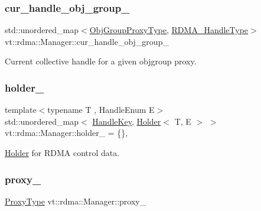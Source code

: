 \subsubsection{\texorpdfstring{cur\+\_\+handle\+\_\+obj\+\_\+group\+\_\+}{cur\_handle\_obj\_group\_}}
{\footnotesize\ttfamily std\+::unordered\+\_\+map$<$\hyperlink{namespacevt_ad7cae989df485fccca57f0792a880a8e}{Obj\+Group\+Proxy\+Type}, \hyperlink{namespacevt_a10442579ec4e7ebef223818e64bcf908}{R\+D\+M\+A\+\_\+\+Handle\+Type}$>$ vt\+::rdma\+::\+Manager\+::cur\+\_\+handle\+\_\+obj\+\_\+group\+\_\+\hspace{0.3cm}{\ttfamily [private]}}



Current collective handle for a given objgroup proxy. 

\mbox{\label{structvt_1_1rdma_1_1_manager_ab5b5ed6b205fba6f378ef22cdb3d4143}} 
\subsubsection{\texorpdfstring{holder\+\_\+}{holder\_}}
{\footnotesize\ttfamily template$<$typename T , Handle\+Enum E$>$ \\
std\+::unordered\+\_\+map$<$ \hyperlink{structvt_1_1rdma_1_1_handle_key}{Handle\+Key}, \hyperlink{structvt_1_1rdma_1_1_holder}{Holder}$<$ T, E $>$ $>$ vt\+::rdma\+::\+Manager\+::holder\+\_\+ = \{\}\hspace{0.3cm}{\ttfamily [static]}, {\ttfamily [private]}}



\hyperlink{structvt_1_1rdma_1_1_holder}{Holder} for R\+D\+MA control data. 

\mbox{\label{structvt_1_1rdma_1_1_manager_a033b59b7b1ecdf7e813d2999c03134cb}} 
\subsubsection{\texorpdfstring{proxy\+\_\+}{proxy\_}}
{\footnotesize\ttfamily \hyperlink{structvt_1_1rdma_1_1_manager_a75d5cdc6428ea19f5ec665b04dcd7166}{Proxy\+Type} vt\+::rdma\+::\+Manager\+::proxy\+\_\+\hspace{0.3cm}{\ttfamily [private]}}



